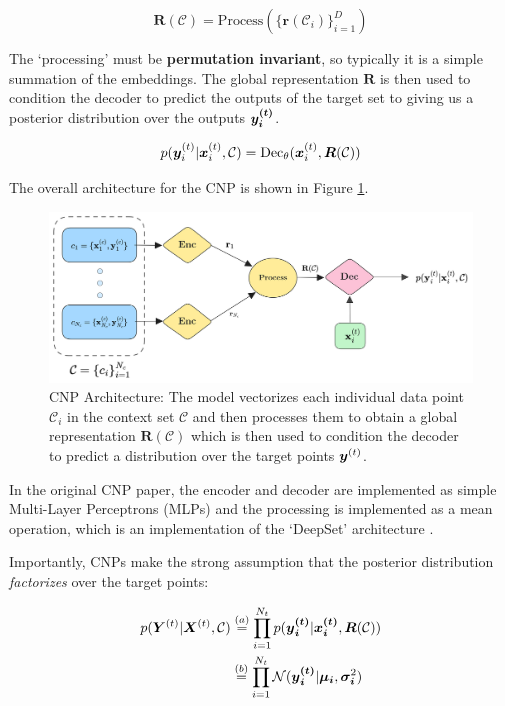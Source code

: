\documentclass[../../main.tex]{subfiles}
\begin{document}
\begin{equation}
    \bm{R}(\mathcal{C}) = \text{Process}(\{ \bm{r}(\mathcal{C}_i) \}_{i=1}^D)
\end{equation}

The `processing' must be \textbf{permutation invariant}, so typically it is a simple summation of the embeddings. The global representation $\bm{R}$ is then used to condition the decoder to predict the outputs of the target set to giving us a posterior distribution over the outputs $\bm{y_i^{(t)}}$.

\begin{equation}
    p(\bm{y}_i^{(t)} | \bm{x}_i^{(t)}, \mathcal{C}) = \text{Dec}_\theta(\bm{x}_i^{(t)}, \bm{R}(\mathcal{C}))
\end{equation}

The overall architecture for the CNP is shown in Figure \ref{fig:cnp-architecture}.

\begin{figure}[H]
	\centering
	\includegraphics[height=0.3\textwidth]{./cnp.png}
	\caption{CNP Architecture: The model vectorizes each individual data point $\mathcal{C}_i$ in the context set $\mathcal{C}$ and then processes them to obtain a global representation $\bm{R}(\mathcal{C})$ which is then used to condition the decoder to predict a distribution over the target points $\bm{y}^{(t)}$.}
    \label{fig:cnp-architecture}
\end{figure}


In the original CNP paper, the encoder and decoder are implemented as simple Multi-Layer Perceptrons (MLPs) and the processing is implemented as a mean operation, which is an implementation of the `DeepSet' architecture \cite{zaheer2018deep}.


Importantly, CNPs make the strong assumption that the posterior distribution \emph{factorizes} over the target points:

\begin{align}
    p(\bm{Y}^{(t)} | \bm{X}^{(t)}, \mathcal{C}) &\stackrel{(a)}{=} \prod_{i=1}^{N_t} p(\bm{{y}_i^{(t)}} | \bm{{x}_i^{(t)}}, \bm{R}(\mathcal{C})) \\ &\stackrel{(b)}{=} \prod_{i=1}^{N_t} \mathcal{N}(\bm{{y}_i^{(t)}} | \bm{\mu_i}, \bm{\sigma_i}^2) 
\end{align}
\end{document}
